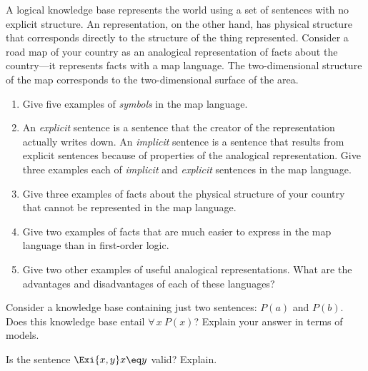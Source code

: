 
\begin{exercise}
A logical knowledge base represents the world
using a set of sentences with no explicit structure. An
representation, on the other hand, has physical structure that
corresponds directly to the structure of the thing represented.
Consider a road map of your country as an analogical representation of
facts about the country---it represents facts with a map language. The two-dimensional structure of the map
corresponds to the two-dimensional surface of the area.
\begin{enumerate}
\item Give five examples of {\it symbols} in the map language.
\item An {\it explicit} sentence is a sentence that the creator of the
representation actually writes down. An {\it implicit} sentence is a sentence
that results from explicit sentences because of properties of the
analogical representation.
Give three examples each of {\it implicit} and {\it explicit}
sentences in the map language.
\item Give three examples of facts about the physical
structure of your country that cannot be represented in the map language.
\item Give two examples of facts that are much easier to express
in the map language than in first-order logic.
\item Give two other examples of useful analogical
representations. What are the advantages and disadvantages of each of
these languages?
\end{enumerate}
\end{exercise} 



\begin{exercise}
Consider a knowledge base containing just two sentences: \(P(a)\) and \(P(b)\).
Does this knowledge base entail \(\forall\,x\ P(x)\)? Explain your answer
in terms of models.
\end{exercise} 

\begin{exercise}
Is the sentence \(\Exi{x,y} x\eq y\) valid? Explain.
\end{exercise} 

